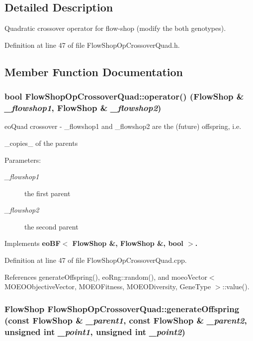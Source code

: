 \subsection{Detailed Description}
Quadratic crossover operator for flow-shop (modify the both genotypes). 



Definition at line 47 of file Flow\-Shop\-Op\-Crossover\-Quad.h.

\subsection{Member Function Documentation}
\subsubsection{\setlength{\rightskip}{0pt plus 5cm}bool Flow\-Shop\-Op\-Crossover\-Quad::operator() (\bf{Flow\-Shop} \& {\em \_\-flowshop1}, \bf{Flow\-Shop} \& {\em \_\-flowshop2})\hspace{0.3cm}{\tt  [virtual]}}\label{classFlowShopOpCrossoverQuad_92f70807bea24d3c233af580e2c55e3a}


eo\-Quad crossover - \_\-flowshop1 and \_\-flowshop2 are the (future) offspring, i.e. 

\_\-copies\_\- of the parents \begin{Desc}
\item[Parameters:]
\begin{description}
\item[{\em \_\-flowshop1}]the first parent \item[{\em \_\-flowshop2}]the second parent \end{description}
\end{Desc}


Implements \bf{eo\-BF$<$ Flow\-Shop \&, Flow\-Shop \&, bool $>$}.

Definition at line 47 of file Flow\-Shop\-Op\-Crossover\-Quad.cpp.

References generate\-Offspring(), eo\-Rng::random(), and moeo\-Vector$<$ MOEOObjective\-Vector, MOEOFitness, MOEODiversity, Gene\-Type $>$::value().
\subsubsection{\setlength{\rightskip}{0pt plus 5cm}\bf{Flow\-Shop} Flow\-Shop\-Op\-Crossover\-Quad::generate\-Offspring (const \bf{Flow\-Shop} \& {\em \_\-parent1}, const \bf{Flow\-Shop} \& {\em \_\-parent2}, unsigned int {\em \_\-point1}, unsigned int {\em \_\-point2})\hspace{0.3cm}{\tt  [private]}}\label{classFlowShopOpCrossoverQuad_cbc2f344a0a29861900f4846597564c3}


